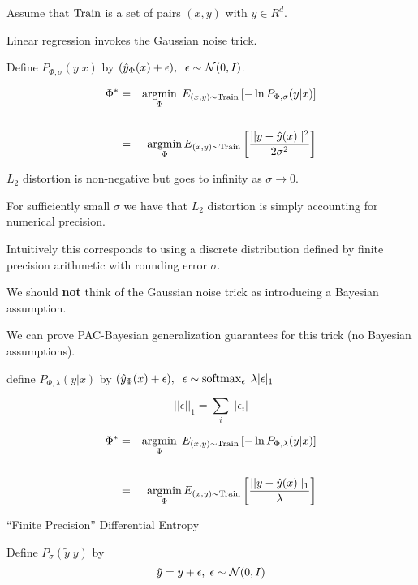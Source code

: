 {{Assume that $\mathrm{Train}$ is a set of pairs $(x,y)$ with $y \in R^d$.

\vfill
Linear regression invokes the Gaussian noise trick.

\vfill
Define $P_{\Phi,\sigma}(y|x)$ by
$(\hat{y}_\Phi(x) + \epsilon),\;\; \epsilon \sim {\cal N}(0,I)$.

{\huge
\begin{eqnarray*}
\Phi^* & = & \operatorname*{argmin}_{\Phi}\;E_{(x,y)\sim \mathrm{Train}}\left[-\ln P_{\Phi,\sigma}(y|x)\right] \\
\\
& = & \operatorname*{argmin}_\Phi E_{(x,y)\sim \mathrm{Train}} \left[\frac{||y - \hat{y}(x)||^2}{2\sigma^2}\right]
\end{eqnarray*}
}

$L_2$ distortion is non-negative but goes to infinity as $\sigma \rightarrow 0$.


For sufficiently small $\sigma$ we have that $L_2$ distortion is simply accounting for numerical precision.

\vfill
Intuitively this corresponds to using a discrete distribution defined by finite precision arithmetic with rounding error $\sigma$.

\vfill
We should {\bf not} think of the Gaussian noise trick as introducing a Bayesian assumption.

\vfill
We can prove PAC-Bayesian generalization guarantees for this trick (no Bayesian assumptions).


define $P_{\Phi,\lambda}(y|x)$ by $(\hat{y}_\Phi(x) + \epsilon),\;\; \epsilon \sim \operatorname*{softmax}_\epsilon \;\lambda |\epsilon|_1$

\vfill
$$||\epsilon||_1 = \sum_i \;|\epsilon_i|$$

\vfill
{\huge
\begin{eqnarray*}
\Phi^* & = & \operatorname*{argmin}_{\Phi}\;E_{(x,y)\sim \mathrm{Train}}\left[-\ln P_{\Phi,\lambda}(y|x)\right] \\
\\
& = & \operatorname*{argmin}_\Phi E_{(x,y)\sim \mathrm{Train}} \left[\frac{||y - \hat{y}(x)||_1}{\lambda}\right]
\end{eqnarray*}
}

{``Finite Precision'' Differential Entropy}

Define $P_\sigma(\tilde{y}|y)$ by
$$\tilde{y} = y + \epsilon,\;\epsilon \sim {\cal N}(0,I)$$

}}
